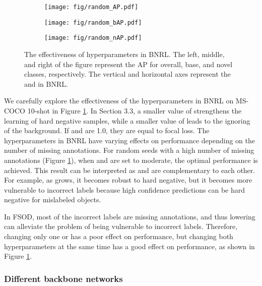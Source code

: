\documentclass{article}
\begin{document}
\begin{figure}[hbt!]
    \centering

    \begin{subfigure}[]{0.32\textwidth}
    \texttt{[image: fig/random\_AP.pdf]}
    \end{subfigure}
    \begin{subfigure}[]{0.32\textwidth}
    \texttt{[image: fig/random\_bAP.pdf]}
    \end{subfigure}
    \begin{subfigure}[]{0.32\textwidth}
    \texttt{[image: fig/random\_nAP.pdf]}
    \end{subfigure}

    \caption{The effectiveness of hyperparameters in BNRL. 
    The left, middle, and right of the figure represent the AP for overall, base, and novel classes, respectively.
    The vertical and horizontal axes represent the  and  in BNRL.
    }
    \label{fig:BNRL}
\end{figure}

We carefully explore the effectiveness of the hyperparameters in BNRL on MS-COCO 10-shot in Figure \ref{fig:BNRL}. 
In Section 3.3, a smaller value of  strengthens the learning of hard negative samples, while a smaller value of  leads to the ignoring of the background.
If  and  are 1.0, they are equal to focal loss.
The hyperparameters in BNRL have varying effects on performance depending on the number of missing annotations. 
For random seeds with a high number of missing annotations (Figure \ref{fig:BNRL}), when  and  are set to moderate, the optimal performance is achieved.
This result can be interpreted as  and  are complementary to each other.
For example, as  grows, it becomes robust to hard negative, but it becomes more vulnerable to incorrect labels because high confidence predictions can be hard negative for mislabeled objects.  

In FSOD, most of the incorrect labels are missing annotations, and thus lowering  can alleviate the problem of being vulnerable to incorrect labels.
Therefore, changing only one  or  has a poor effect on performance, but changing both hyperparameters at the same time has a good effect on performance, as shown in Figure \ref{fig:BNRL}.


\subsubsection{Different backbone networks}
\end{document}
